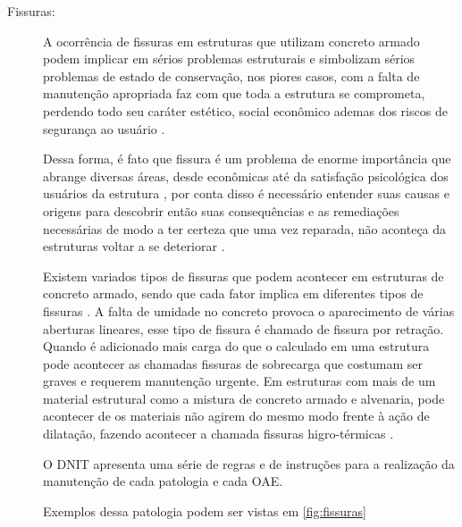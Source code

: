 \begin{description}
    \item[Fissuras:]
    A ocorrência de fissuras em estruturas que utilizam concreto armado podem implicar em sérios problemas estruturais e simbolizam sérios problemas de estado de conservação, nos piores casos, com a falta de manutenção apropriada faz com que toda a estrutura se comprometa, perdendo todo seu caráter estético, social econômico ademas dos riscos de segurança ao usuário \cite{santos2014patologia}.
    
    Dessa forma, é fato que fissura é um problema de enorme importância que abrange diversas áreas, desde econômicas até da satisfação psicológica dos usuários da estrutura \cite{andrade1998durabilidade}, por conta disso é necessário entender suas causas e origens para descobrir então suas consequências e as remediações necessárias de modo a ter certeza que uma vez reparada, não aconteça da estruturas voltar a se deteriorar \cite{de1998patologia}.
    
    Existem variados tipos de fissuras que podem acontecer em estruturas de concreto armado, sendo que cada fator implica em diferentes tipos de fissuras \cite{nakamura2007}. 
    A falta de umidade no concreto provoca o aparecimento de várias aberturas lineares, esse tipo de fissura é chamado de fissura por retração. 
    Quando é adicionado mais carga do que o calculado em uma estrutura pode acontecer as chamadas fissuras de sobrecarga que costumam ser graves e requerem manutenção urgente. 
    Em estruturas com mais de um material estrutural como a mistura de concreto armado e alvenaria, pode acontecer de os materiais não agirem do mesmo modo frente à ação de dilatação, fazendo acontecer a chamada fissuras higro-térmicas \cite{nakamura2007}.
    
    O DNIT apresenta uma série de regras e de instruções para a realização da manutenção de cada patologia e cada OAE.
    
    Exemplos dessa patologia podem ser vistas em \autoref{fig:fissuras}
    

\end{description}
